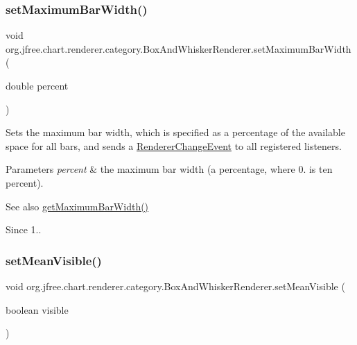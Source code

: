 \subsubsection{\texorpdfstring{set\+Maximum\+Bar\+Width()}{setMaximumBarWidth()}}
{\footnotesize\ttfamily void org.\+jfree.\+chart.\+renderer.\+category.\+Box\+And\+Whisker\+Renderer.\+set\+Maximum\+Bar\+Width (\begin{DoxyParamCaption}\item[{double}]{percent }\end{DoxyParamCaption})}

Sets the maximum bar width, which is specified as a percentage of the available space for all bars, and sends a \mbox{\hyperlink{}{Renderer\+Change\+Event}} to all registered listeners.


\begin{DoxyParams}{Parameters}
{\em percent} & the maximum bar width (a percentage, where 0. is ten percent).\\
\hline
\end{DoxyParams}
\begin{DoxySeeAlso}{See also}
\mbox{\hyperlink{classorg_1_1jfree_1_1chart_1_1renderer_1_1category_1_1_box_and_whisker_renderer_a75dac37a934f1d6fbc517d54b3e6f2ec}{get\+Maximum\+Bar\+Width()}}
\end{DoxySeeAlso}
\begin{DoxySince}{Since}
1.. 
\end{DoxySince}
\mbox{\label{classorg_1_1jfree_1_1chart_1_1renderer_1_1category_1_1_box_and_whisker_renderer_a400684ac91972f5c31f81113c04099cf}} 
\subsubsection{\texorpdfstring{set\+Mean\+Visible()}{setMeanVisible()}}
{\footnotesize\ttfamily void org.\+jfree.\+chart.\+renderer.\+category.\+Box\+And\+Whisker\+Renderer.\+set\+Mean\+Visible (\begin{DoxyParamCaption}\item[{boolean}]{visible }\end{DoxyParamCaption})}

